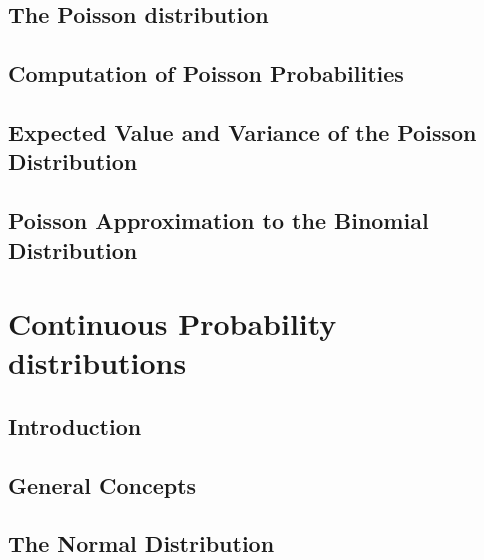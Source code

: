 \documentclass[12pt,]{article}
\begin{document}
\hypertarget{the-poisson-distribution}{%
\subsection{The Poisson distribution}\label{the-poisson-distribution}}

\hypertarget{computation-of-poisson-probabilities}{%
\subsection{Computation of Poisson
Probabilities}\label{computation-of-poisson-probabilities}}

\hypertarget{expected-value-and-variance-of-the-poisson-distribution}{%
\subsection{Expected Value and Variance of the Poisson
Distribution}\label{expected-value-and-variance-of-the-poisson-distribution}}

\hypertarget{poisson-approximation-to-the-binomial-distribution}{%
\subsection{Poisson Approximation to the Binomial
Distribution}\label{poisson-approximation-to-the-binomial-distribution}}

\hypertarget{continuous-probability-distributions}{%
\section{Continuous Probability
distributions}\label{continuous-probability-distributions}}

\hypertarget{introduction-1}{%
\subsection{Introduction}\label{introduction-1}}

\hypertarget{general-concepts}{%
\subsection{General Concepts}\label{general-concepts}}

\hypertarget{the-normal-distribution}{%
\subsection{The Normal Distribution}\label{the-normal-distribution}}
\end{document}
